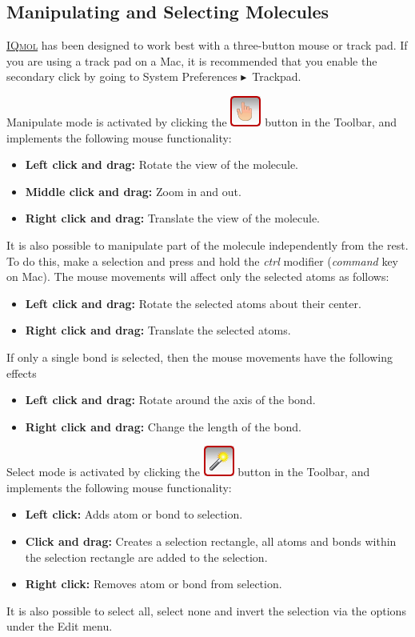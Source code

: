\documentclass[a4paper,12pt]{article}
\newcommand{\iqmol}{\href{https://www.iqmol.org}{{\scshape IQmol}}}
\newcommand{\bt}{\ensuremath{\blacktriangleright}}
\begin{document}
\subsection{Manipulating and Selecting Molecules}
\label{sec:mousemodes}

\iqmol{} has been designed to work best with a three-button mouse or track pad.
If you are using a track pad on a  Mac, it is recommended that you enable the
secondary click by going to System Preferences \bt\ Trackpad.

Manipulate mode is activated by clicking the
\includegraphics[scale=0.40]{figures/ManipulateButton.png} button in the
Toolbar, and implements the following mouse functionality:
\begin{itemize}
\item {\bf Left click and drag:} Rotate the view of the molecule.  
\item {\bf Middle click and drag:} Zoom in and out.  
\item {\bf Right click and drag:} Translate the view of the molecule.
\end{itemize}

It is also possible to manipulate part of the molecule independently from the
rest.  To do this, make a selection and press and hold the \emph{ctrl} modifier
(\emph{command} key on Mac).  The mouse movements will affect only the 
selected atoms as follows:
\begin{itemize}
\item {\bf Left click and drag:} Rotate the selected atoms about their center. 
\item {\bf Right click and drag:} Translate the selected atoms.  
\end{itemize}
If only a single bond is selected, then the mouse movements have the following effects
\begin{itemize}
\item {\bf Left click and drag:} Rotate around the axis of the bond.
\item {\bf Right click and drag:} Change the length of the bond.
\end{itemize}

Select mode is activated by clicking the
\includegraphics[scale=0.40]{figures/SelectButton.png} button in the Toolbar,
and implements the following mouse functionality:
\begin{itemize}
\item {\bf Left click:} Adds atom or bond to selection. 
\item {\bf Click and drag:} Creates a selection rectangle, all atoms and bonds
           within the selection rectangle are added to the selection. 
\item {\bf Right click:}  Removes atom or bond from selection.
\end{itemize}
It is also possible to select all, select none and invert the selection via
the options under the Edit menu.
\end{document}
